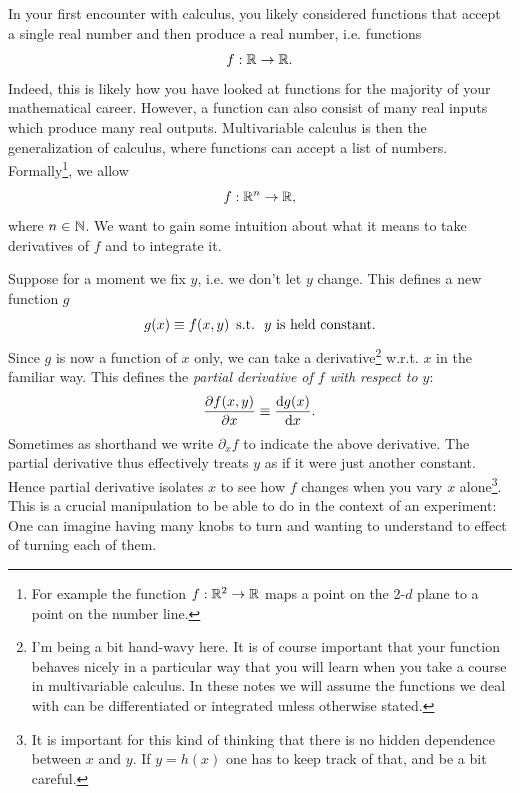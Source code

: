 In your first encounter with calculus, you likely considered
functions that accept a single real number and then
produce a real number, i.e. functions
\begin{equation}
f:\mathbb{R}\to\mathbb{R}.
\end{equation}
Indeed, this is likely how you have looked at functions for the
majority of your mathematical career. However, a function can also consist of
many real inputs which produce many real outputs. Multivariable calculus is then
the generalization of calculus, where functions can
accept a list of numbers.
Formally\footnote{For example the function $f:\mathbb{R}^2\to\mathbb{R}$
maps a point on the 2-$d$ plane to a point on the number line.}, 
we allow 
\begin{equation}
f:\mathbb{R}^n\to\mathbb{R},
\end{equation}
where $n\in\mathbb{N}$.
We want to gain some intuition about what it means to take derivatives
of $f$ and to integrate it.

Suppose for a moment we fix $y$, i.e. we don't let $y$ change. This defines a
new function $g$
\begin{equation}\label{eq:fixG}
g(x)\equiv f(x,y)\,~\text{s.t.}~\text{ $y$ is held constant}.
\end{equation}
Since $g$ is now a function of $x$ only, we can take a derivative\footnote{I'm
being a bit hand-wavy here. It is of course important that your function behaves
nicely in a particular way that you will learn when you take a course in
multivariable calculus. In these notes we will assume the functions we deal with
can be differentiated or integrated unless otherwise stated.} w.r.t. 
$x$ in the familiar way. This defines the {\it partial derivative of $f$ with
respect to $y$}:
\begin{equation}\label{eq:pdv}
\pdv{f(x,y)}{x}\equiv\frac{\dd g(x)}{\dd x}.
\end{equation}
Sometimes as shorthand we write $\partial_x f$ to indicate the above derivative. 
The partial derivative thus effectively treats $y$ as
if it were just another constant. 
Hence partial derivative isolates $x$ to see how $f$
changes when you vary $x$ alone\footnote{It is important for this kind of
thinking that there is no hidden dependence between $x$ and $y$. If $y=h(x)$ one
has to keep track of that, and be a bit careful.}. This is a crucial
manipulation to be able to do in the context of an experiment: One can imagine
having many knobs to turn and wanting to understand to effect of turning each of
them.

